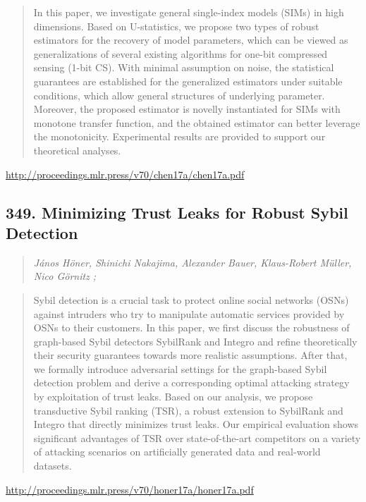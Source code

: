 \documentclass{article}
\begin{document}
\begin{quote}
    In this paper, we investigate general single-index models (SIMs) in high dimensions. Based on U-statistics, we propose two types of robust estimators for the recovery of model parameters, which can be viewed as generalizations of several existing algorithms for one-bit compressed sensing (1-bit CS). With minimal assumption on noise, the statistical guarantees are established for the generalized estimators under suitable conditions, which allow general structures of underlying parameter. Moreover, the proposed estimator is novelly instantiated for SIMs with monotone transfer function, and the obtained estimator can better leverage the monotonicity. Experimental results are provided to support our theoretical analyses.  \end{quote}

\href{http://proceedings.mlr.press/v70/chen17a/chen17a.pdf}{http://proceedings.mlr.press/v70/chen17a/chen17a.pdf}

\subsection{349. Minimizing Trust Leaks for Robust Sybil Detection}

\begin{quote}
\footnotesize{\textit{János Höner, Shinichi Nakajima, Alexander Bauer, Klaus-Robert Müller, Nico Görnitz ;}}
\end{quote}

\begin{quote}
    Sybil detection is a crucial task to protect online social networks (OSNs) against intruders who try to manipulate automatic services provided by OSNs to their customers. In this paper, we first discuss the robustness of graph-based Sybil detectors SybilRank and Integro and refine theoretically their security guarantees towards more realistic assumptions. After that, we formally introduce adversarial settings for the graph-based Sybil detection problem and derive a corresponding optimal attacking strategy by exploitation of trust leaks. Based on our analysis, we propose transductive Sybil ranking (TSR), a robust extension to SybilRank and Integro that directly minimizes trust leaks. Our empirical evaluation shows significant advantages of TSR over state-of-the-art competitors on a variety of attacking scenarios on artificially generated data and real-world datasets.  \end{quote}

\href{http://proceedings.mlr.press/v70/honer17a/honer17a.pdf}{http://proceedings.mlr.press/v70/honer17a/honer17a.pdf}
\end{document}
